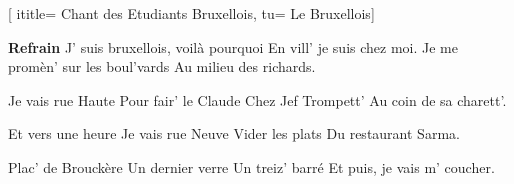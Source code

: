  [
ititle= {Chant des Etudiants Bruxellois},
tu= {Le Bruxellois}]


\beginchorus
\textbf {Refrain}
J' suis bruxellois, voilà pourquoi
En vill' je suis chez moi.
Je me promèn' sur les boul'vards
Au milieu des richards.
\endchorus

\beginverse
Je vais rue Haute
Pour fair' le Claude
Chez Jef Trompett'
Au coin de sa charett'.
\endverse

\beginverse
Et vers une heure
Je vais rue Neuve
Vider les plats
Du restaurant Sarma.
\endverse

\beginverse
Plac' de Brouckère
Un dernier verre
Un treiz' barré
Et puis, je vais m' coucher.
\endverse

\endsong